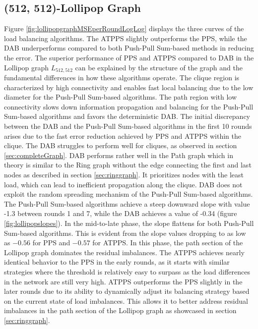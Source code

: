 \subsection{(512, 512)-Lollipop Graph}
Figure \ref{fig:lollipopgraphMSEperRoundLogLog} displays the three curves of the load balancing algorithms. The ATPPS slightly outperforms the PPS, while the DAB underperforms compared to both Push-Pull Sum-based methods in reducing the error. The superior performance of PPS and ATPPS compared to DAB in the Lollipop graph $L_{512,512}$ can be explained by the structure of the graph and the fundamental differences in how these algorithms operate. The clique region is characterized by high connectivity and enables fast local balancing due to the low diameter for the Push-Pull Sum-based algorithms. The path region with low connectivity slows down information propagation and balancing for the Push-Pull Sum-based algorithms and favors the deterministic DAB. The initial discrepancy between the DAB and the Push-Pull Sum-based algorithms in the first 10 rounds arises due to the fast error reduction achieved by PPS and ATPPS within the clique. The DAB struggles to perform well for cliques, as observed in section \ref{sec:completeGraph}. DAB performs rather well in the Path graph which in theory is similar to the Ring graph without the edge connecting the first and last nodes as described in section \ref{sec:ringgraph}. It prioritizes nodes with the least load, which can lead to inefficient propagation along the clique. DAB does not exploit the random spreading mechanism of the Push-Pull Sum-based algorithms. The Push-Pull Sum-based algorithms achieve a steep downward slope with value -1.3 between rounds 1 and 7, while the DAB achieves a value of -0.34 (figure \ref{fig:lollipopslopes}). In the mid-to-late phase, the slope flattens for both Push-Pull Sum-based algorithms. This is evident from the slope values dropping to as low as $-0.56$ for PPS and $-0.57$ for ATPPS. In this phase, the path section of the Lollipop graph dominates the residual imbalances. The ATPPS achieves nearly identical behavior to the PPS in the early rounds, as it starts with similar strategies where the threshold is relatively easy to surpass as the load differences in the network are still very high. ATPPS outperforms the PPS slightly in the later rounds due to its ability to dynamically adjust its balancing strategy based on the current state of load imbalances. This allows it to better address residual imbalances in the path section of the Lollipop graph as showcased in section \ref{sec:ringgraph}.

